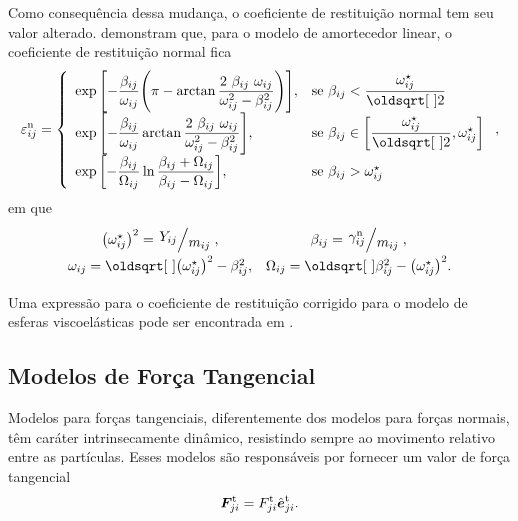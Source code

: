 Como consequência dessa mudança, o coeficiente de restituição normal tem seu valor alterado.  demonstram que, para o modelo de amortecedor linear, o coeficiente de restituição normal fica
\begin{equation*}
	\normalCoefficientOfRestitutionij = 
	\left\lbrace
		\def\arraystretch{1.8}
		\begin{array}{ll}
			\exp\bqty{-\dfrac{\betaij}{\omegaij}\pqty{\pi - \arctan\dfrac{2\ \betaij\ \omegaij}{\omegaij^2-\betaij^2}}}, & \text{se } \betaij < \dfrac{\omegazij}{\sqrt{2}} \\
			\exp\bqty{-\dfrac{\betaij}{\omegaij}\arctan\dfrac{2\ \betaij\ \omegaij}{\omegaij^2-\betaij^2}}, & \text{se } \betaij \in \bqty{\dfrac{\omegazij}{\sqrt{2}}, \omegazij} \\
			\exp\bqty{-\dfrac{\betaij}{\Omegaij} \ln\dfrac{\betaij + \Omegaij}{\betaij - \Omegaij}}, & \text{se } \betaij > \omegazij
		\end{array}
	\right.
	,
\end{equation*}
em que
\begin{equation*}
	\def\arraystretch{1.5}
	\begin{array}{cc}
		\pqty{\omegazij}^2 = \bigslant{\elasticModulusij}{\massij}, &
		\betaij = \bigslant{\normalDampingConstantij}{\massij}, \\
		\omegaij = \sqrt{\pqty{\omegazij}^2 - \betaij^2}, &	\Omegaij = \sqrt{\betaij^2 - \pqty{\omegazij}^2}.
	\end{array}
\end{equation*}

Uma expressão para o coeficiente de restituição corrigido para o modelo de esferas viscoelásticas pode ser encontrada em .

\subsection{Modelos de Força Tangencial} \label{subsec:tangential_force_models}

Modelos para forças tangenciais, diferentemente dos modelos para forças normais, têm caráter intrinsecamente dinâmico, resistindo sempre ao movimento relativo entre as partículas. Esses modelos são responsáveis por fornecer um valor de força tangencial
\begin{equation*}
	{\bm{F}}_{j i}^{\text{t}} = {F}_{j i}^{\text{t}}{\hat{\bm{e}}}_{j i}^{\text{t}}.
\end{equation*}

